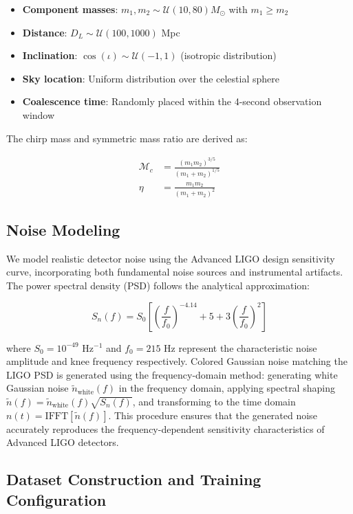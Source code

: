 \documentclass{iopjournal}
\begin{document}
\begin{itemize}
\item \textbf{Component masses}: $m_1, m_2 \sim \mathcal{U}(10, 80) M_\odot$ with $m_1 \geq m_2$
\item \textbf{Distance}: $D_L \sim \mathcal{U}(100, 1000)$ Mpc
\item \textbf{Inclination}: $\cos(\iota) \sim \mathcal{U}(-1, 1)$ (isotropic distribution)
\item \textbf{Sky location}: Uniform distribution over the celestial sphere
\item \textbf{Coalescence time}: Randomly placed within the 4-second observation window
\end{itemize}

The chirp mass and symmetric mass ratio are derived as:

\begin{align}
\mathcal{M}_c &= \frac{(m_1 m_2)^{3/5}}{(m_1 + m_2)^{1/5}} \\
\eta &= \frac{m_1 m_2}{(m_1 + m_2)^2}
\end{align}

\subsection{Noise Modeling}

We model realistic detector noise using the Advanced LIGO design sensitivity curve, incorporating both fundamental noise sources and instrumental artifacts. The power spectral density (PSD) follows the analytical approximation:

\begin{equation}
S_n(f) = S_0 \left[ \left(\frac{f}{f_0}\right)^{-4.14} + 5 + 3\left(\frac{f}{f_0}\right)^2 \right]
\end{equation}

where $S_0 = 10^{-49}$ Hz$^{-1}$ and $f_0 = 215$ Hz represent the characteristic noise amplitude and knee frequency respectively. Colored Gaussian noise matching the LIGO PSD is generated using the frequency-domain method: generating white Gaussian noise $\tilde{n}_{\text{white}}(f)$ in the frequency domain, applying spectral shaping $\tilde{n}(f) = \tilde{n}_{\text{white}}(f) \sqrt{S_n(f)}$, and transforming to the time domain $n(t) = \text{IFFT}[\tilde{n}(f)]$. This procedure ensures that the generated noise accurately reproduces the frequency-dependent sensitivity characteristics of Advanced LIGO detectors.

\subsection{Dataset Construction and Training Configuration}
\end{document}
